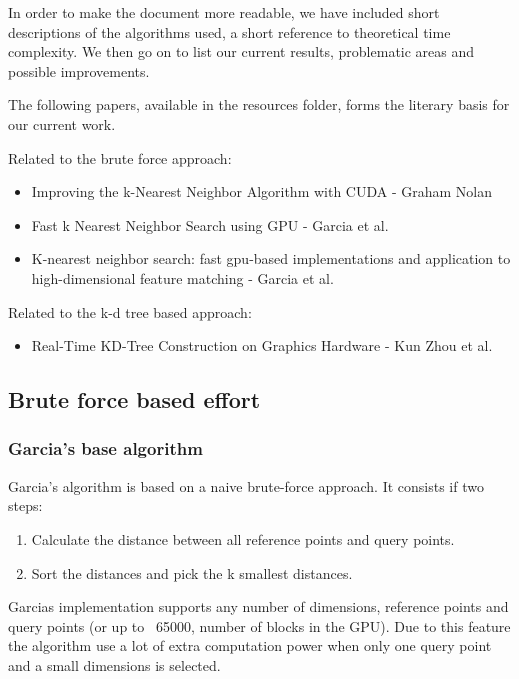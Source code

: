 In order to make the document more readable, we have included short descriptions of the algorithms used, a short reference to theoretical time complexity. We then go on to list our current results, problematic areas and possible improvements.

The following papers, available in the resources folder, forms the literary basis for our current work.

Related to the brute force approach:
\begin{itemize}
    \item Improving the k-Nearest Neighbor Algorithm with CUDA - Graham Nolan
    \item Fast k Nearest Neighbor Search using GPU - Garcia et al.
    \item K-nearest neighbor search: fast gpu-based implementations and application to high-dimensional feature matching - Garcia et al.
\end{itemize}

Related to the k-d tree based approach:
\begin{itemize}
    \item Real-Time KD-Tree Construction on Graphics Hardware - Kun Zhou et al.
\end{itemize}


\subsection{Brute force based effort} %
\label{sub:brute_force_based_effort}

\subsubsection{Garcia's base algorithm} %
\label{ssub:garcias_base_algorithme}

Garcia's algorithm is based on a naive brute-force approach. It consists if two steps:
\begin{enumerate}
    \item Calculate the distance between all reference points and query points.
    \item Sort the distances and pick the k smallest distances.
\end{enumerate}

Garcias implementation supports any number of dimensions, reference points and query points (or up to ~65000, number of blocks in the GPU). Due to this feature the algorithm use a lot of extra computation power when only one query point and a small dimensions is selected.

